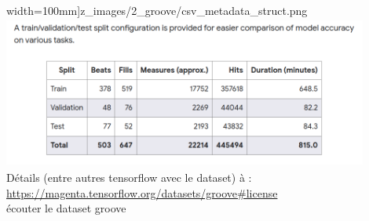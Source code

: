 	width=100mm]{z_images/2_groove/csv_metadata_struct.png}\\
	\includegraphics[height=50mm, width=120mm]{z_images/2_groove/train_validation_test.png}\\
	Détails (entre autres tensorflow avec le dataset) à :
	\url{https://magenta.tensorflow.org/datasets/groove#license}\\
	écouter le dataset groove
	\newpage